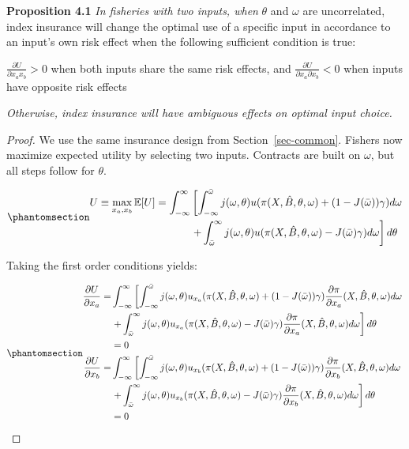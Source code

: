 \documentclass[
  letterpaper,
  DIV=11,
  numbers=noendperiod]{scrartcl}
\theoremstyle{plain}
\theoremstyle{plain}
\theoremstyle{remark}
\begin{document}
\textbf{Proposition 4.1} \emph{In fisheries with two inputs, when}
\(\theta\) and \(\omega\) are uncorrelated, index insurance will change
the optimal use of a specific input in accordance to an input's own risk
effect when the following sufficient condition is true:

\(\frac{\partial U}{\partial x_a x_b}>0\) when both inputs share the
same risk effects, and
\(\frac{\partial U}{\partial x_a \partial x_b}<0\) when inputs have
opposite risk effects

\emph{Otherwise, index insurance will have ambiguous effects on optimal
input choice.}

\begin{proof}
We use the same insurance design from Section~\ref{sec-common}. Fishers
now maximize expected utility by selecting two inputs. Contracts are
built on \(\omega\), but all steps follow for \(\theta\).

\begin{equation}\phantomsection\label{eq-max2}{
\begin{aligned}
U\equiv\max_{x_a,x_b}\mathbb{E}[U]=\int^{\infty}_{-\infty}&\left[ \int^{\bar \omega}_{-\infty}j(\omega,\theta)u(\pi(X,\hat{B},\theta,\omega)+(1-J(\bar \omega))\gamma)d\omega \right.\\
&\left.+\int^{\infty}_{\bar{\omega}}j(\omega,\theta) u(\pi(X,\hat{B},
\theta,\omega)-J(\bar \omega)\gamma)d\omega\right] d\theta
\end{aligned}
}\end{equation}

Taking the first order conditions yields:

\begin{equation}\phantomsection\label{eq-foc2}{
\begin{aligned}
\frac{\partial U}{\partial x_a}=&\int^{\infty}_{-\infty}\left[ \int^{\bar \omega}_{-\infty}j(\omega,\theta)u_{x_a}(\pi(X,\hat{B},\theta,\omega)+(1-J(\bar \omega))\gamma)\frac{\partial \pi}{\partial x_a}(X,\hat{B},\theta,\omega)d\omega\right.\\
&\left.+\int^{\infty}_{\bar{\omega}}j(\omega,\theta) u_{x_a}(\pi(X,\hat{B},\theta,\omega)-J(\bar \omega)\gamma)\frac{\partial \pi}{\partial x_a}(X,\hat{B},\theta,\omega)d\omega\right] d\theta\\
&=0\\
\frac{\partial U}{\partial x_b}=&\int^{\infty}_{-\infty}\left[ \int^{\bar \omega}_{-\infty}j(\omega,\theta)u_{x_b}(\pi(X,\hat{B},\theta,\omega)+(1-J(\bar \omega))\gamma)\frac{\partial \pi}{\partial x_b}(X,\hat{B},\theta,\omega)d\omega\right.\\
&\left.+\int^{\infty}_{\bar{\omega}}j(\omega,\theta) u_{x_b}(\pi(X,\hat{B},\theta,\omega)-J(\bar \omega)\gamma)\frac{\partial \pi}{\partial x_b}(X,\hat{B},\theta,\omega)d\omega\right] d\theta\\
&=0
\end{aligned}
}\end{equation}


\end{proof}
\end{document}
